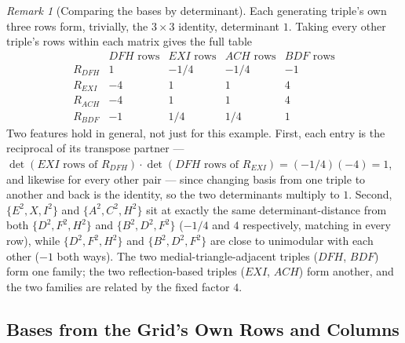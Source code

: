 \documentclass[12pt]{article}
\theoremstyle{remark}
\newtheorem{remark}[theorem]{Remark}
\begin{document}
\begin{remark}[Comparing the bases by determinant]
Each generating triple's own three rows form, trivially, the
$3\times3$ identity, determinant $1$. Taking every other triple's
rows within each matrix gives the full table
\[
\begin{array}{c|cccc}
 & DFH\text{ rows} & EXI\text{ rows} & ACH\text{ rows} & BDF\text{ rows} \\
\hline
R_{DFH} & 1 & -1/4 & -1/4 & -1 \\
R_{EXI} & -4 & 1 & 1 & 4 \\
R_{ACH} & -4 & 1 & 1 & 4 \\
R_{BDF} & -1 & 1/4 & 1/4 & 1
\end{array}
\]
Two features hold in general, not just for this example. First, each
entry is the reciprocal of its transpose partner ---
$\det(EXI\text{ rows of }R_{DFH}) \cdot \det(DFH\text{ rows of }R_{EXI})
= (-1/4)(-4) = 1$, and likewise for every other pair --- since
changing basis from one triple to another and back is the identity,
so the two determinants multiply to $1$. Second, $\{E^2,X,I^2\}$ and
$\{A^2,C^2,H^2\}$ sit at exactly the same determinant-distance from
both $\{D^2,F^2,H^2\}$ and $\{B^2,D^2,F^2\}$ ($-1/4$ and $4$
respectively, matching in every row), while $\{D^2,F^2,H^2\}$ and
$\{B^2,D^2,F^2\}$ are close to unimodular with each other ($-1$ both
ways). The two medial-triangle-adjacent triples ($DFH$, $BDF$) form
one family; the two reflection-based triples ($EXI$, $ACH$) form
another, and the two families are related by the fixed factor $4$.
\end{remark}

\subsection{Bases from the Grid's Own Rows and Columns}
\end{document}
